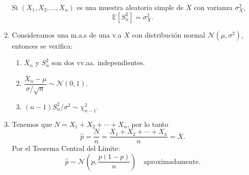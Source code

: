\begin{enumerate}[label=\color{red}\textbf{\arabic*)}]
    Si $(X_1,X_2,\dots,X_n)$ es una muestra aleatoria simple de $X$ con varianza  $\sigma_X^2$, \[
      \mathbb{E}[S_n^2]=\sigma_X^2.
    \] 
  \item {}

    Consideramos una m.a.s de una v.a $X$ con distribución normal  $\mathcal{N}(\mu,\sigma^2)$, entonces se verifica:
    \begin{enumerate}[label=\arabic*)]
      \item $\overline{X}_n$ y $S_n^2$ son dos vv.aa. independientes.
      \item $\dfrac{\overline{X}_n-\mu}{\sigma/\sqrt{n} }\sim \mathcal{N}(0,1)$.
      \item $(n-1)S_n^2 /\sigma^2\sim \chi_{n-1}^2$.
    \end{enumerate}
  \item {} 

    Tenemos que $N=X_1+X_2+\cdots+X_n$, por lo tanto \[
    \hat{p}=\dfrac{N}{n}=\dfrac{X_1+X_2+\cdots+X_n}{n}=\overline{X}.
    \] 
    Por el Teorema Central del Límite: \[
    \hat{p}\sim \mathcal{N}\left( p,\dfrac{p(1-p)}{n} \right) \quad \text{aproximadamente.}
    \] 
\end{enumerate}
